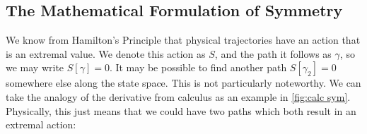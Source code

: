 \subsection{The Mathematical Formulation of Symmetry}
We know from Hamilton's Principle that physical trajectories have an action that is an extremal value. We denote this action as $S$, and the path it follows as $\gamma$, so we may write $S[\gamma]=0$. It may be possible to find another path $S[\gamma_2]=0$ somewhere else along the state space. This is not particularly noteworthy. We can take the analogy of the derivative from calculus as an example in \autoref{fig:calc sym}. Physically, this just means that we could have two paths which both result in an extremal action:
\begin{figure}[H]
    \centering


\begin{tikzpicture}[x=0.75pt,y=0.75pt,yscale=-0.7,xscale=0.7]


\end{tikzpicture}
\end{figure}

